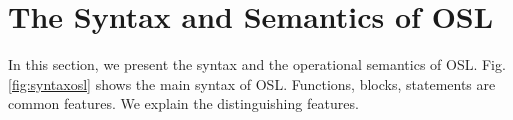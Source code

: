 \documentclass[runningheads]{llncs}
\def\codec#1{\texttt{#1}}
\begin{document}
% 
%






\section{The Syntax and Semantics of OSL}
\label{sec:osl-syntaxandsemantics}
In this section, we present the syntax and the operational semantics of OSL. Fig. \ref{fig:syntaxosl} shows the main syntax of OSL. 
Functions, blocks, statements are common features.
We explain the distinguishing features.
\end{document}
